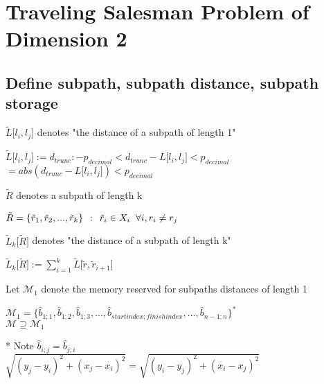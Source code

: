 \documentclass[11pt]{article}
\begin{document}
\newpage
\section*{Traveling Salesman Problem of Dimension 2}
\subsection{Define subpath, subpath distance, subpath storage}
\vspace{2mm}
$\tilde{L} \lbrack l_i,l_j \rbrack$ denotes "the distance of a subpath of length 1"
\begin{center}
$
\tilde{L} \lbrack l_i,l_j \rbrack :=d_{trunc} : -p_{decimal} < d_{trunc} - L\lbrack l_i,l_j \rbrack < p_{decimal} 
$
\\ \vspace{2mm}
$
= abs(d_{trunc} - L\lbrack l_i,l_j \rbrack) < p_{decimal} 
$
\end{center}
\vspace{4mm}
$
\tilde{R}$ denotes a subpath of length k
\begin{center}
$
\tilde{R} = \{\tilde{r}_1,\tilde{r}_2,...,\tilde{r}_k\} \hspace{1.5mm} : \hspace{1.5mm} \tilde{r}_i \in X_i \hspace{2mm} \forall i, r_i \neq r_j
$
\end{center}
\vspace{4mm}
$\tilde{L}_k\lbrack \tilde{R} \rbrack$ denotes "the distance of a subpath of length k"
\begin{center}
$
\tilde{L}_k\lbrack \tilde{R} \rbrack := \sum_{i=1}^{k} \tilde{L}\lbrack \tilde{r},\tilde{r}_{i+1}\rbrack
$ 
\end{center}
\vspace{4mm}
Let $\mathcal{M}_1$ denote the memory reserved for subpaths distances of length 1
\begin{center}
$
\mathcal{M}_1= \{\hat{b}_{1;1},\hat{b}_{1;2},\hat{b}_{1;3},...,\hat{b}_{startindex;finishindex},...,\hat{b}_{n-1;n}\}^*
$
\\ \vspace{2mm}
$
\mathcal{M} \supseteq \mathcal{M}_1
$
\end{center}
\vspace{3mm}* Note $\hat{b}_{i;j} = \hat{b}_{j;i}$\\
$\sqrt{(y_j - y_i)^2 + (x_j - x_i)^2} = \sqrt{(y_i - y_j)^2 + (x_i - x_j)^2}$



\end{document}
